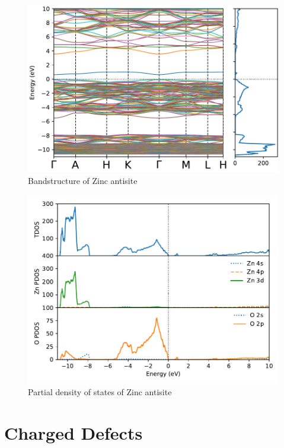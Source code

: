 \begin{figure}[tbh!]
	\centering
	\includegraphics[width=0.7\linewidth]{"images/rnd/band-dos_Zn_anti"}
	\caption[Bandstructure of Zinc antisite]{Bandstructure of Zinc antisite}
\end{figure}

\begin{figure}[tbh!]
	\centering
	\includegraphics[width=0.7\linewidth]{"images/rnd/dos-pdos_Zn_anti"}
	\caption[Partial density of states of Zinc antisite]{Partial density of states of Zinc antisite}
\end{figure}


\clearpage
\section{Charged Defects}





